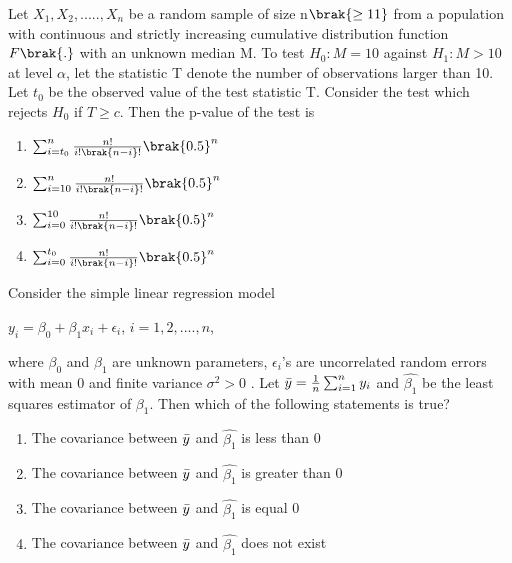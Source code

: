 \iffalse
\chapter{2024}
\author{AI24BTECH11013}
\section{st}
\fi
\item Let $X_1,X_2,.....,X_n$ be a random sample of size n$\brak{\geq 11}$ from a population with continuous and strictly increasing cumulative distribution function $F\brak{.}$ with an unknown median M. To test $H_0 : M = 10$ against $H_1 : M > 10$ at level $\alpha$, let the statistic T denote the number of observations larger than 10. Let $t_0$ be the observed value of the test statistic T. Consider the test which rejects $H_0$ if $T \geq c$. Then the p-value of the test is 
\begin{enumerate}
    \item $\sum_{i=t_0}^n \frac{n!}{i!\brak{n-i}!}\brak{0.5}^n$
    \item $\sum_{i=10}^n \frac{n!}{i!\brak{n-i}!}\brak{0.5}^n$
    \item $\sum_{i=0}^{10} \frac{n!}{i!\brak{n-i}!}\brak{0.5}^n$
    \item $\sum_{i=0}^{t_0} \frac{n!}{i!\brak{n-i}!}\brak{0.5}^n$
\end{enumerate}
\item Consider the simple linear regression model 
\begin{center}
    $y_i = {\beta}_0 + {\beta}_1 x_i + {\epsilon}_i$, $i=1,2,....,n$, 
\end{center}
where ${\beta}_0$ and ${\beta}_1$ are unknown parameters, ${\epsilon}_i$'s
 are uncorrelated random errors with mean 0 and finite variance ${\sigma}^2 > 0$ . Let $\Bar{y}= \frac{1}{n}\sum_{i=1}^n y_i$ and $\hat{\beta_1}$ be the least squares estimator of $\beta_1$. Then which of the following statements is true? 
 \begin{enumerate}
     \item The covariance between $\Bar{y}$ and $\hat{\beta_1}$ is less than 0
     \item The covariance between $\Bar{y}$ and $\hat{\beta_1}$ is greater than 0
     \item The covariance between $\Bar{y}$ and $\hat{\beta_1}$ is equal 0
     \item The covariance between $\Bar{y}$ and $\hat{\beta_1}$ does not exist
     \end{enumerate}
